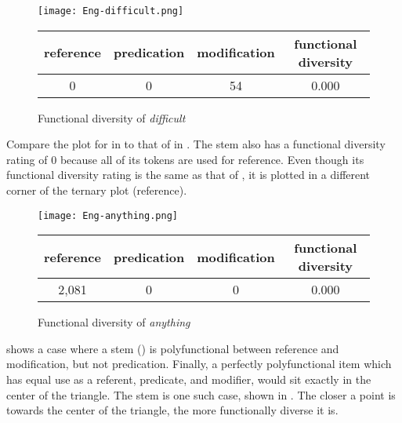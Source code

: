\begin{figure}

  \centering
  \caption{Functional diversity of  \textit{difficult}}
  \label{fig:Eng-difficult}

  \texttt{[image: Eng-difficult.png]}

  \begin{tabular}{ c c c c }
    \toprule
    reference & predication & modification & functional diversity\\
    \midrule
    0         & 0           & 54           & 0.000      \\
    \bottomrule
  \end{tabular}

\end{figure}

Compare the plot for  in  to that of  in . The stem  also has a functional diversity rating of $0$ because all of its tokens are used for reference. Even though its functional diversity rating is the same as that of , it is plotted in a different corner of the ternary plot (reference).

\begin{figure}

  \centering
  \caption{Functional diversity of  \textit{anything}}
  \label{fig:Eng-anything}

  \texttt{[image: Eng-anything.png]}

  \begin{tabular}{ c c c c }
    \toprule
    reference & predication & modification & functional diversity\\
    \midrule
    2,081     & 0           & 0            & 0.000      \\
    \bottomrule
  \end{tabular}

\end{figure}

 shows a case where a stem () is polyfunctional between reference and modification, but not predication. Finally, a perfectly polyfunctional item which has equal use as a referent, predicate, and modifier, would sit exactly in the center of the triangle. The  stem   is one such case, shown in . The closer a point is towards the center of the triangle, the more functionally diverse it is.

